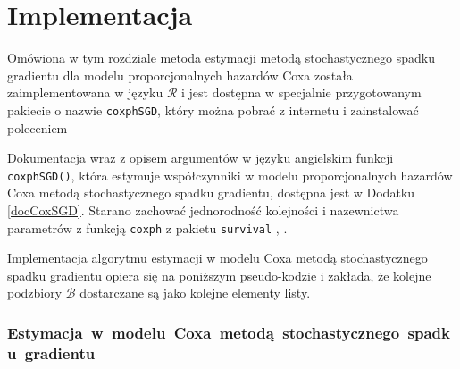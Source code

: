 \section{Implementacja}\label{implemento}

Omówiona w tym rozdziale metoda estymacji metodą stochastycznego spadku gradientu dla modelu proporcjonalnych hazardów Coxa została zaimplementowana w języku $\mathcal{R}$ \cite{programikr} i jest dostępna w specjalnie przygotowanym pakiecie o nazwie \texttt{coxphSGD}, który można pobrać z internetu i zainstalować poleceniem
\begin{Shaded}
\begin{Highlighting}[]
\NormalTok{(}\NormalTok{)}
\end{Highlighting}
\end{Shaded}

Dokumentacja wraz z opisem argumentów w języku angielskim funkcji \texttt{coxphSGD()}, która estymuje współczynniki w modelu
proporcjonalnych hazardów Coxa metodą stochastycznego spadku gradientu, dostępna jest w Dodatku \ref{docCoxSGD}.
Starano zachować jednorodność kolejności i nazewnictwa parametrów z funkcją \texttt{coxph} z pakietu \texttt{survival} \cite{ther}, \cite{survival}.

Implementacja algorytmu estymacji w modelu Coxa metodą stochastycznego spadku gradientu opiera się na poniższym pseudo-kodzie i zakłada, że kolejne podzbiory \(\mathcal{B}\) dostarczane są jako kolejne elementy listy.
\subsubsection{Estymacja~w~modelu~Coxa~metodą~stochastycznego~spadku~gradientu}


